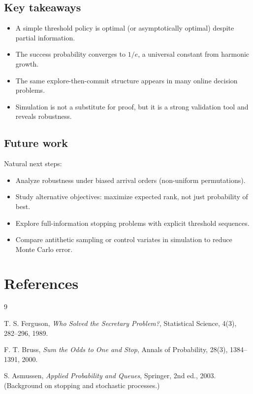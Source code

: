 \documentclass[11pt]{article}
\theoremstyle{plain}
\theoremstyle{definition}
\theoremstyle{remark}
\newcommand{\1}{\mathbf{1}}
\begin{document}
\subsection{Key takeaways}
\begin{itemize}
\item A simple threshold policy is optimal (or asymptotically optimal) despite partial information.
\item The success probability converges to $1/e$, a universal constant from harmonic growth.
\item The same explore-then-commit structure appears in many online decision problems.
\item Simulation is not a substitute for proof, but it is a strong validation tool and reveals robustness.
\end{itemize}

\subsection{Future work}
Natural next steps:
\begin{itemize}
\item Analyze robustness under biased arrival orders (non-uniform permutations).
\item Study alternative objectives: maximize expected rank, not just probability of best.
\item Explore full-information stopping problems with explicit threshold sequences.
\item Compare antithetic sampling or control variates in simulation to reduce Monte Carlo error.
\end{itemize}

\section*{References}
\begin{thebibliography}{9}

T. S. Ferguson,
\emph{Who Solved the Secretary Problem?},
Statistical Science, 4(3), 282--296, 1989.

F. T. Bruss,
\emph{Sum the Odds to One and Stop},
Annals of Probability, 28(3), 1384--1391, 2000.

S. Asmussen,
\emph{Applied Probability and Queues},
Springer, 2nd ed., 2003. (Background on stopping and stochastic processes.)

\end{thebibliography}
\end{document}
